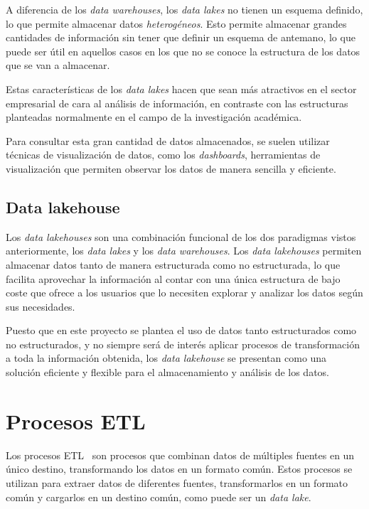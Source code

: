 A diferencia de los \textit{data warehouses}, los \textit{data lakes} no tienen un
esquema definido, lo que permite almacenar datos \textit{heterogéneos}. Esto permite
almacenar grandes cantidades de información sin tener que definir un esquema de antemano,
lo que puede ser útil en aquellos casos en los que no se conoce la estructura de los
datos que se van a almacenar.

Estas características de los \textit{data lakes} hacen que sean más atractivos en el sector
empresarial de cara al análisis de información, en contraste con las estructuras planteadas
normalmente en el campo de la investigación académica.

Para consultar esta gran cantidad de datos almacenados, se suelen utilizar técnicas de
visualización de datos, como los \textit{dashboards}, herramientas de visualización que
permiten observar los datos de manera sencilla y eficiente.

\subsection{Data lakehouse}\label{sec:lakehouse}
Los \textit{data lakehouses} son una combinación funcional de los dos paradigmas vistos
anteriormente, los \textit{data lakes} y los \textit{data warehouses}. Los \textit{data
lakehouses} permiten almacenar datos tanto de manera estructurada como no estructurada,
lo que facilita aprovechar la información al contar con una única estructura de bajo coste
que ofrece a los usuarios que lo necesiten explorar y analizar los datos según sus necesidades.

Puesto que en este proyecto se plantea el uso de datos tanto estructurados como no estructurados,
y no siempre será de interés aplicar procesos de transformación a toda la información obtenida,
los \textit{data lakehouse} se presentan como una solución eficiente y flexible para el almacenamiento
y análisis de los datos.

\newpage{}
\section{Procesos ETL}\label{sec:etl}
Los procesos ETL~\cite{mier2023dashboards} son procesos que combinan datos de múltiples
fuentes en un único destino, transformando los datos en un formato común. Estos procesos
se utilizan para extraer datos de diferentes fuentes, transformarlos en un formato común
y cargarlos en un destino común, como puede ser un \textit{data lake}.

